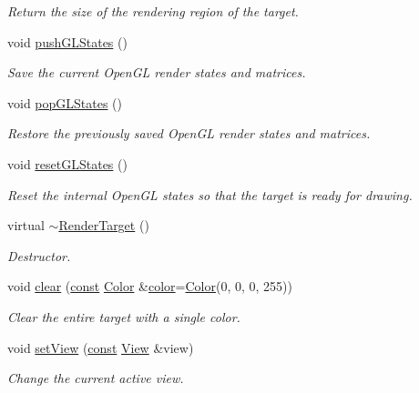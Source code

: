 \begin{DoxyCompactItemize}
\begin{DoxyCompactList}\small\item\em Return the size of the rendering region of the target. \end{DoxyCompactList}\item 
void \hyperlink{classsf_1_1_render_target_a8d1998464ccc54e789aaf990242b47f7}{push\-G\-L\-States} ()
\begin{DoxyCompactList}\small\item\em Save the current Open\-G\-L render states and matrices. \end{DoxyCompactList}\item 
void \hyperlink{classsf_1_1_render_target_ad5a98401113df931ddcd54c080f7aa8e}{pop\-G\-L\-States} ()
\begin{DoxyCompactList}\small\item\em Restore the previously saved Open\-G\-L render states and matrices. \end{DoxyCompactList}\item 
void \hyperlink{classsf_1_1_render_target_aac7504990d27dada4bfe3c7866920765}{reset\-G\-L\-States} ()
\begin{DoxyCompactList}\small\item\em Reset the internal Open\-G\-L states so that the target is ready for drawing. \end{DoxyCompactList}\item 
virtual \hyperlink{classsf_1_1_render_target_a9abd1654a99fba46f6887b9c625b9b06}{$\sim$\-Render\-Target} ()
\begin{DoxyCompactList}\small\item\em Destructor. \end{DoxyCompactList}\item 
void \hyperlink{classsf_1_1_render_target_a6bb6f0ba348f2b1e2f46114aeaf60f26}{clear} (\hyperlink{term__entry_8h_a57bd63ce7f9a353488880e3de6692d5a}{const} \hyperlink{classsf_1_1_color}{Color} \&\hyperlink{_entity_8cpp_a864889304a90873adb9c6e289a54bcf4}{color}=\hyperlink{classsf_1_1_color}{Color}(0, 0, 0, 255))
\begin{DoxyCompactList}\small\item\em Clear the entire target with a single color. \end{DoxyCompactList}\item 
void \hyperlink{classsf_1_1_render_target_a063db6dd0a14913504af30e50cb6d946}{set\-View} (\hyperlink{term__entry_8h_a57bd63ce7f9a353488880e3de6692d5a}{const} \hyperlink{classsf_1_1_view}{View} \&view)
\begin{DoxyCompactList}\small\item\em Change the current active view. \end{DoxyCompactList}\item 

\end{DoxyCompactItemize}
